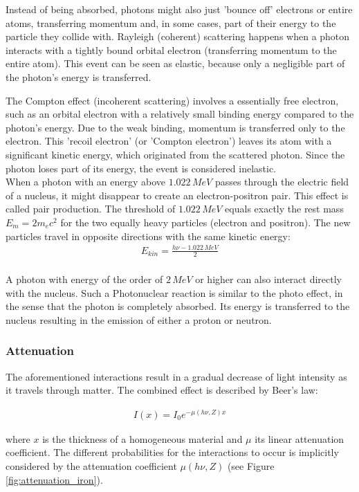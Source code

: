 Instead of being absorbed, photons might also just 'bounce off' electrons or entire atoms, transferring momentum and, in some cases, part of their energy to the particle they collide with.
Rayleigh (coherent) scattering happens when a photon interacts with a tightly bound orbital electron (transferring momentum to the entire atom).
This event can be seen as elastic, because only a negligible part of the photon's energy is transferred.

The Compton effect (incoherent scattering) involves a essentially free electron, such as an orbital electron with a relatively small binding energy compared to the photon's energy.
Due to the weak binding, momentum is transferred only to the electron.
This 'recoil electron' (or 'Compton electron') leaves its atom with a significant kinetic energy, which originated from the scattered photon.
Since the photon loses part of its energy, the event is considered inelastic. \\

When a photon with an energy above $1.022 \, MeV$ passes through the electric field of a nucleus, it might disappear to create an electron-positron pair.
This effect is called pair production.
The threshold of $1.022 \, MeV$ equals exactly the rest mass $E_m = 2m_ec^2$ for the two equally heavy particles (electron and positron).
The new particles travel in opposite directions with the same kinetic energy:
\begin{align}
 E_{kin} = \frac{h\nu - 1.022 \, MeV}{2}
\end{align} \\

A photon with energy of the order of $2 \, MeV$ or higher can also interact directly with the nucleus.
Such a Photonuclear reaction is similar to the photo effect, in the sense that the photon is completely absorbed.
Its energy is transferred to the nucleus resulting in the emission of either a proton or neutron.

\subsubsection{Attenuation}
The aforementioned interactions result in a gradual decrease of light intensity as it travels through matter.
The combined effect is described by Beer's law:

\begin{align}
I(x) = I_0 e^{-\mu(h\nu,Z)x}
\end{align}

where $x$ is the thickness of a homogeneous material and $\mu$ its linear attenuation coefficient.
The different probabilities for the interactions to occur is implicitly considered by the attenuation coefficient $\mu(h\nu,Z)$ (see Figure \ref{fig:attenuation_iron}).

